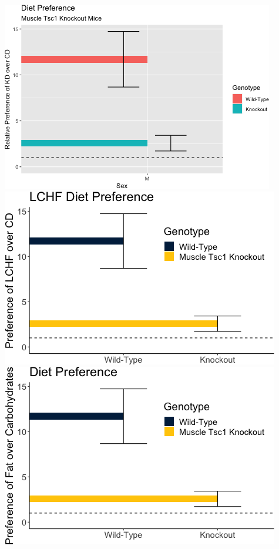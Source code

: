 \documentclass[]{article}
\begin{document}
\includegraphics{figures/knockout-effects-barplot-relative-preference-males-1.png}
\includegraphics{figures/knockout-effects-barplot-relative-preference-males-2.png}
\includegraphics{figures/knockout-effects-barplot-relative-preference-males-3.png}
\end{document}
